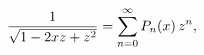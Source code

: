 \[\frac{1}{\sqrt{1-2xz+z^{2}}}=\sum_{n=0}^{\infty}\mathop{P_{n}\/}\nolimits\!%
\left(x\right)z^{n},\]